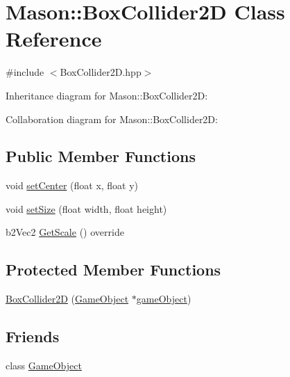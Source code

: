 \hypertarget{class_mason_1_1_box_collider2_d}{}\section{Mason\+:\+:Box\+Collider2D Class Reference}
\label{class_mason_1_1_box_collider2_d}


{\ttfamily \#include $<$Box\+Collider2\+D.\+hpp$>$}



Inheritance diagram for Mason\+:\+:Box\+Collider2D\+:


Collaboration diagram for Mason\+:\+:Box\+Collider2D\+:
\subsection*{Public Member Functions}
\begin{DoxyCompactItemize}
\item 
void \hyperlink{class_mason_1_1_box_collider2_d_aa2c5bb9d3f7e0c64f8784dce237676b4}{set\+Center} (float x, float y)
\item 
void \hyperlink{class_mason_1_1_box_collider2_d_af6ee6df0351c4a59b344a274626b032d}{set\+Size} (float width, float height)
\item 
b2\+Vec2 \hyperlink{class_mason_1_1_box_collider2_d_a396aa615690a67c855b5025e3a1b3bce}{Get\+Scale} () override
\end{DoxyCompactItemize}
\subsection*{Protected Member Functions}
\begin{DoxyCompactItemize}
\item 
\hyperlink{class_mason_1_1_box_collider2_d_ab74dd3e9b390bd7580e0137503000ac1}{Box\+Collider2D} (\hyperlink{class_mason_1_1_game_object}{Game\+Object} $\ast$\hyperlink{class_mason_1_1_component_a30030370c35f5562cbbbb0927b0448c8}{game\+Object})
\end{DoxyCompactItemize}
\subsection*{Friends}
\begin{DoxyCompactItemize}
\item 
class \hyperlink{class_mason_1_1_box_collider2_d_a00df87c957d8f7ee0fc51f07a0542f4a}{Game\+Object}
\end{DoxyCompactItemize}
